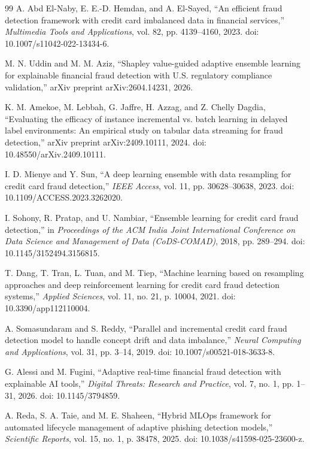 \begin{thebibliography}{99}
A. Abd El-Naby, E. E.-D. Hemdan, and A. El-Sayed, ``An efficient fraud detection framework with credit card imbalanced data in financial services,'' \textit{Multimedia Tools and Applications}, vol. 82, pp. 4139--4160, 2023. doi: 10.1007/s11042-022-13434-6.

M. N. Uddin and M. M. Aziz, ``Shapley value-guided adaptive ensemble learning for explainable financial fraud detection with U.S. regulatory compliance validation,'' arXiv preprint arXiv:2604.14231, 2026.

K. M. Amekoe, M. Lebbah, G. Jaffre, H. Azzag, and Z. Chelly Dagdia, ``Evaluating the efficacy of instance incremental vs. batch learning in delayed label environments: An empirical study on tabular data streaming for fraud detection,'' arXiv preprint arXiv:2409.10111, 2024. doi: 10.48550/arXiv.2409.10111.

I. D. Mienye and Y. Sun, ``A deep learning ensemble with data resampling for credit card fraud detection,'' \textit{IEEE Access}, vol. 11, pp. 30628--30638, 2023. doi: 10.1109/ACCESS.2023.3262020.

I. Sohony, R. Pratap, and U. Nambiar, ``Ensemble learning for credit card fraud detection,'' in \textit{Proceedings of the ACM India Joint International Conference on Data Science and Management of Data (CoDS-COMAD)}, 2018, pp. 289--294. doi: 10.1145/3152494.3156815.

T. Dang, T. Tran, L. Tuan, and M. Tiep, ``Machine learning based on resampling approaches and deep reinforcement learning for credit card fraud detection systems,'' \textit{Applied Sciences}, vol. 11, no. 21, p. 10004, 2021. doi: 10.3390/app112110004.

A. Somasundaram and S. Reddy, ``Parallel and incremental credit card fraud detection model to handle concept drift and data imbalance,'' \textit{Neural Computing and Applications}, vol. 31, pp. 3--14, 2019. doi: 10.1007/s00521-018-3633-8.

G. Alessi and M. Fugini, ``Adaptive real-time financial fraud detection with explainable AI tools,'' \textit{Digital Threats: Research and Practice}, vol. 7, no. 1, pp. 1--31, 2026. doi: 10.1145/3794859.

A. Reda, S. A. Taie, and M. E. Shaheen, ``Hybrid MLOps framework for automated lifecycle management of adaptive phishing detection models,'' \textit{Scientific Reports}, vol. 15, no. 1, p. 38478, 2025. doi: 10.1038/s41598-025-23600-z.


\end{thebibliography}

